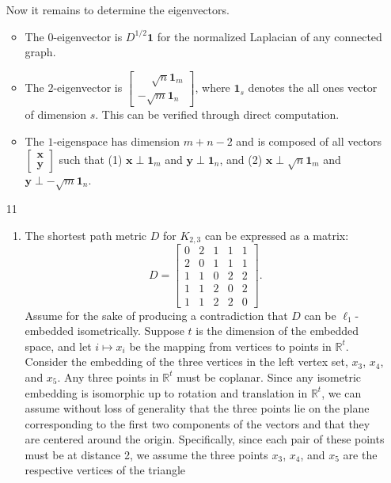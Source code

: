\documentclass{article}
\newcommand{\R}{\mathbb{R}}
\newcommand{\1}{\mathbf{1}}
\newcommand{\0}{\mathbf{0}}
\begin{document}
\begin{enumerate}
  Now it remains to determine the eigenvectors.
  \begin{itemize}
  \item The $0$-eigenvector is $D^{1 / 2} \1$ for the normalized Laplacian of any connected graph.
  \item The $2$-eigenvector is $\begin{bmatrix} \phantom{-} \sqrt{n} \1_m \\ - \sqrt{m} \1_n \end{bmatrix}$, where $\1_s$ denotes the all ones vector of dimension $s$.
    This can be verified through direct computation.
  \item
    The $1$-eigenspace has dimension $m + n - 2$ and is composed of all vectors $\begin{bmatrix} \mathbf{x} \\ \mathbf{y} \end{bmatrix}$ such that (1) $\mathbf{x} \perp \1_m$ and $\mathbf{y} \perp \1_n$, and (2) $\mathbf{x} \perp \sqrt{n} \1_m$ and $\mathbf{y} \perp -\sqrt{m} \1_n$.
  \end{itemize}
\item[11]
  \begin{enumerate}
  \item
    The shortest path metric $D$ for $K_{2,3}$ can be expressed as a matrix:
    \begin{equation*}
      D =
      \begin{bmatrix}
        0 & 2 & 1 & 1 & 1 \\
        2 & 0 & 1 & 1 & 1 \\
        1 & 1 & 0 & 2 & 2 \\
        1 & 1 & 2 & 0 & 2 \\
        1 & 1 & 2 & 2 & 0
      \end{bmatrix}
      .
    \end{equation*}
    Assume for the sake of producing a contradiction that $D$ can be $\ell_1$-embedded isometrically.
    Suppose $t$ is the dimension of the embedded space, and let $i \mapsto x_i$ be the mapping from vertices to points in $\R^t$.
    Consider the embedding of the three vertices in the left vertex set, $x_3$, $x_4$, and $x_5$.
    Any three points in $\R^t$ must be coplanar.
    Since any isometric embedding is isomorphic up to rotation and translation in $\R^t$, we can assume without loss of generality that the three points lie on the plane corresponding to the first two components of the vectors and that they are centered around the origin.
    Specifically, since each pair of these points must be at distance 2, we assume the three points $x_3$, $x_4$, and $x_5$ are the respective vertices of the triangle

\end{enumerate}
\end{enumerate}
\end{document}
